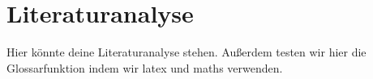 \chapter{Literaturanalyse}
Hier könnte deine Literaturanalyse stehen.
Außerdem testen wir hier die Glossarfunktion indem wir \gls{latex} und \gls{maths} verwenden.